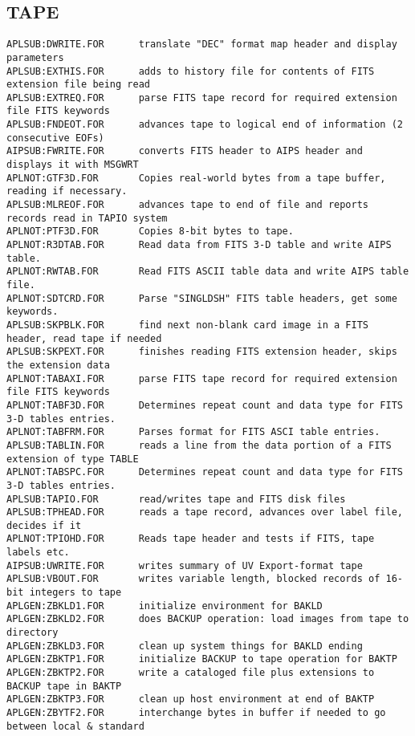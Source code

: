 \subsection{TAPE}
\begin{verbatim}
APLSUB:DWRITE.FOR      translate "DEC" format map header and display parameters
APLSUB:EXTHIS.FOR      adds to history file for contents of FITS extension file being read
APLSUB:EXTREQ.FOR      parse FITS tape record for required extension file FITS keywords
APLSUB:FNDEOT.FOR      advances tape to logical end of information (2 consecutive EOFs)
AIPSUB:FWRITE.FOR      converts FITS header to AIPS header and displays it with MSGWRT
APLNOT:GTF3D.FOR       Copies real-world bytes from a tape buffer, reading if necessary.
APLSUB:MLREOF.FOR      advances tape to end of file and reports records read in TAPIO system
APLNOT:PTF3D.FOR       Copies 8-bit bytes to tape.
APLNOT:R3DTAB.FOR      Read data from FITS 3-D table and write AIPS table.
APLNOT:RWTAB.FOR       Read FITS ASCII table data and write AIPS table file.
APLNOT:SDTCRD.FOR      Parse "SINGLDSH" FITS table headers, get some keywords.
APLSUB:SKPBLK.FOR      find next non-blank card image in a FITS header, read tape if needed
APLSUB:SKPEXT.FOR      finishes reading FITS extension header, skips the extension data
APLNOT:TABAXI.FOR      parse FITS tape record for required extension file FITS keywords
APLNOT:TABF3D.FOR      Determines repeat count and data type for FITS 3-D tables entries.
APLNOT:TABFRM.FOR      Parses format for FITS ASCI table entries.
APLSUB:TABLIN.FOR      reads a line from the data portion of a FITS extension of type TABLE
APLNOT:TABSPC.FOR      Determines repeat count and data type for FITS 3-D tables entries.
APLSUB:TAPIO.FOR       read/writes tape and FITS disk files
APLSUB:TPHEAD.FOR      reads a tape record, advances over label file, decides if it
APLNOT:TPIOHD.FOR      Reads tape header and tests if FITS, tape labels etc.
AIPSUB:UWRITE.FOR      writes summary of UV Export-format tape
APLSUB:VBOUT.FOR       writes variable length, blocked records of 16-bit integers to tape
APLGEN:ZBKLD1.FOR      initialize environment for BAKLD
APLGEN:ZBKLD2.FOR      does BACKUP operation: load images from tape to directory
APLGEN:ZBKLD3.FOR      clean up system things for BAKLD ending
APLGEN:ZBKTP1.FOR      initialize BACKUP to tape operation for BAKTP
APLGEN:ZBKTP2.FOR      write a cataloged file plus extensions to BACKUP tape in BAKTP
APLGEN:ZBKTP3.FOR      clean up host environment at end of BAKTP
APLGEN:ZBYTF2.FOR      interchange bytes in buffer if needed to go between local & standard

\end{verbatim}
